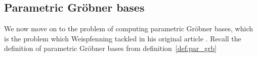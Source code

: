 \documentclass[a4paper, 12pt]{article}
\DeclareMathOperator{\lcm}{lcm}
\theoremstyle{changedot}
\theoremstyle{changedotbreak}
\theoremstyle{nonumberplain}
\begin{document}




\subsection{Parametric Gröbner bases}
We now move on to the problem of computing parametric Gröbner bases, which is the problem which Weispfenning tackled in his original article \cite{Weispfenning}. Recall the definition of parametric Gröbner bases from definition~\ref{def:par_grb}
\end{document}
